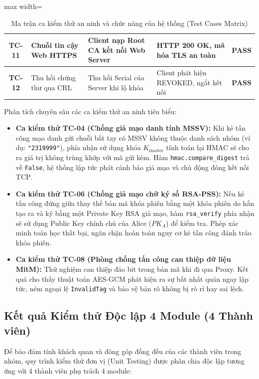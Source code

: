 \documentclass[a4paper,12pt]{article}
\begin{document}
\begin{table}[H]
\begin{adjustbox}{max width=\textwidth}
\begin{tabular}{|c|l|p{6cm}|l|c|}
\textbf{TC-11} & Chuỗi tin cậy Web HTTPS & Client nạp Root CA kết nối Web Server & HTTP 200 OK, mã hóa TLS an toàn & \textbf{PASS} \\ \hline
\textbf{TC-12} & Thu hồi chứng thư qua CRL & Thu hồi Serial của Server khi lộ khóa & Client phát hiện REVOKED, ngắt kết nối & \textbf{PASS} \\ \hline
\end{tabular}
\end{adjustbox}
\caption{Ma trận ca kiểm thử an ninh và chức năng của hệ thống (Test Cases Matrix)}
\label{tab:test_cases_matrix}
\end{table}

Phân tích chuyên sâu các ca kiểm thử an ninh tiêu biểu:
\begin{itemize}
    \item \textbf{Ca kiểm thử TC-04 (Chống giả mạo danh tính MSSV):} Khi kẻ tấn công mạo danh gửi chuỗi bắt tay có MSSV không thuộc danh sách nhóm (ví dụ: \texttt{"2319999"}), phía nhận sử dụng khóa $K_{\text{master}}$ tính toán lại HMAC sẽ cho ra giá trị không trùng khớp với mã gửi kèm. Hàm \texttt{hmac.compare\_digest} trả về \texttt{False}, hệ thống lập tức phát cảnh báo giả mạo và chủ động đóng kết nối TCP.
    \item \textbf{Ca kiểm thử TC-06 (Chống giả mạo chữ ký số RSA-PSS):} Nếu kẻ tấn công đứng giữa thay thế bản mã khóa phiên bằng một khóa phiên do hắn tạo ra và ký bằng một Private Key RSA giả mạo, hàm \texttt{rsa\_verify} phía nhận sẽ sử dụng Public Key chính chủ của Alice ($PK_A$) để kiểm tra. Phép xác minh toán học thất bại, ngăn chặn hoàn toàn nguy cơ kẻ tấn công đánh tráo khóa phiên.
    \item \textbf{Ca kiểm thử TC-08 (Phòng chống tấn công can thiệp dữ liệu MitM):} Thử nghiệm can thiệp đảo bit trong bản mã khi đi qua Proxy. Kết quả cho thấy thuật toán AES-GCM phát hiện ra sự bất nhất quán ngay lập tức, ném ngoại lệ \texttt{InvalidTag} và bảo vệ bản rõ không bị rò rỉ hay sai lệch.
\end{itemize}

\subsection{Kết quả Kiểm thử Độc lập 4 Module (4 Thành viên)}
Để bảo đảm tính khách quan và đóng góp đồng đều của các thành viên trong nhóm, quy trình kiểm thử đơn vị (Unit Testing) được phân chia độc lập tương ứng với 4 thành viên phụ trách 4 module:
\end{document}
